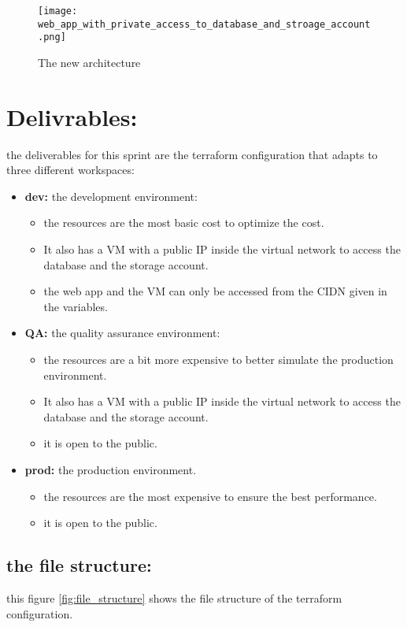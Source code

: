 \begin{figure}[htpb]
    \centering
    \texttt{[image: web\_app\_with\_private\_access\_to\_database\_and\_stroage\_account.png]}
    \caption{The new architecture}
    \label{fig:new_arch}
\end{figure}

\section{Delivrables:}
the deliverables for this sprint are the terraform configuration that adapts to three different workspaces:
\begin{itemize}
    \item \textbf{dev:} the development environment:
    \begin{itemize}
        \item the resources are the most basic cost to optimize the cost.
        \item It also has a VM with a public IP inside the virtual network to access the database and the storage account.
        \item the web app and the VM can only be accessed from the CIDN given in the variables.
    \end{itemize}
    \item \textbf{QA:} the quality assurance environment:
    \begin{itemize}
        \item the resources are a bit more expensive to better simulate the production environment.
        \item It also has a VM with a public IP inside the virtual network to access the database and the storage account.
        \item it is open to the public.
    \end{itemize}
    \item \textbf{prod:} the production environment.
    \begin{itemize}
        \item the resources are the most expensive to ensure the best performance.
        \item it is open to the public.
    \end{itemize}
\end{itemize}
\subsection*{the file structure:}
this figure \ref{fig:file_structure} shows the file structure of the terraform configuration.

